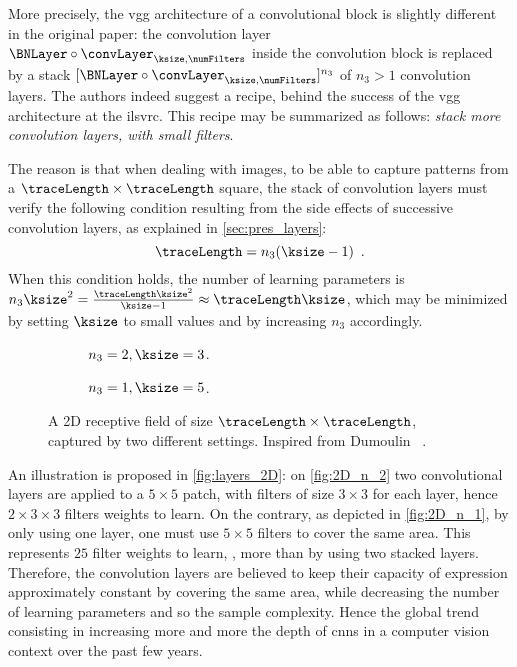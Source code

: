 \begin{remark}
	\label{remark:2D_VGG}
	More precisely, the \gls{vgg} architecture of a convolutional block is slightly different in the original paper: the convolution layer \(\BNLayer \circ \convLayer_{\ksize, \numFilters}\) inside the convolution block is replaced by a stack \([\BNLayer \circ \convLayer_{\ksize, \numFilters}]^{n_3}\) of \(n_3>1\) convolution layers.
	The authors indeed suggest a recipe, behind the success of the \gls{vgg} architecture at the \gls{ilsvrc}.
	This recipe may be summarized as follows: \emph{stack more convolution layers, with small filters}.
	
	The reason is that when dealing with images, to be able to capture patterns from a \(\traceLength \times \traceLength\) square, the stack of convolution layers must verify the following condition resulting from the side effects of successive convolution layers, as explained in \autoref{sec:pres_layers}:
	\begin{equation}
		\traceLength = n_3 (\ksize - 1) \enspace .
	\end{equation}
	When this condition holds, the number of learning parameters is \(n_3 \ksize^2 = \frac{\traceLength \ksize^2}{\ksize-1} \approx \traceLength \ksize\), which may be minimized by setting \(\ksize\) to small values and by increasing \(n_3\) accordingly.
	\begin{figure}[H]
		\centering
		\begin{subfigure}{0.49 \textwidth}
			\centering
			
			\caption{\(n_3 = 2, \ksize=3\).}
			\label{fig:2D_n_2}
		\end{subfigure}
		\begin{subfigure}{0.49 \textwidth}
			\centering
			
			\caption{\(n_3 = 1, \ksize=5\).}
			\label{fig:2D_n_1}
		\end{subfigure}
		\caption{A 2D receptive field of size  \(\traceLength \times \traceLength\), captured by two different settings.
		Inspired from Dumoulin \etal{}~\cite{dumoulin_guide_2016}.}
		\label{fig:layers_2D}
	\end{figure}
	An illustration is proposed in \autoref{fig:layers_2D}: on \autoref{fig:2D_n_2} two convolutional layers are applied to a \(5\times5\) patch, with filters of size \(3\times3\) for each layer, hence \(2 \times 3 \times 3\) filters weights to learn.
	On the contrary, as depicted in \autoref{fig:2D_n_1}, by only using one layer, one must use \(5\times5\) filters to cover the same area.
	This represents \(25\) filter weights to learn, \ie{}, more than by using two stacked layers.
	Therefore, the convolution layers are believed to keep their capacity of expression approximately constant by covering the same area, while decreasing the number of learning parameters and so the sample complexity.
	Hence the global trend consisting in increasing more and more the depth of \glspl{cnn} in a computer vision context over the past few years.
\end{remark}

